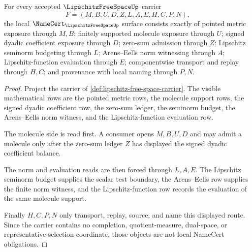 \begin{theorem}
\label{thm:lipschitz-free-space-namecert-obligations}
For every accepted $\LipschitzFreeSpaceUp$ carrier
$$
F=(M,B,U,D,Z,L,A,E,H,C,P,N),
$$
the local $\NameCert_{\LipschitzFreeSpaceUp}$ surface consists exactly of pointed metric exposure through $M,B$; finitely supported molecule exposure through $U$; signed dyadic coefficient exposure through $D$; zero-sum admission through $Z$; Lipschitz seminorm budgeting through $L$; Arens--Eells norm witnessing through $A$; Lipschitz-function evaluation through $E$; componentwise transport and replay through $H,C$; and provenance with local naming through $P,N$.
\end{theorem}
\begin{proof}
Project the carrier of \autoref{def:lipschitz-free-space-carrier}. The visible mathematical rows are the pointed metric rows, the molecule support rows, the signed dyadic coefficient row, the zero-sum ledger, the seminorm budget, the Arens--Eells norm witness, and the Lipschitz-function evaluation row.

The molecule side is read first. A consumer opens $M,B,U,D$ and may admit a molecule only after the zero-sum ledger $Z$ has displayed the signed dyadic coefficient balance.

The norm and evaluation reads are then forced through $L,A,E$. The Lipschitz seminorm budget supplies the scalar test boundary, the Arens--Eells row supplies the finite norm witness, and the Lipschitz-function row records the evaluation of the same molecule support.

Finally $H,C,P,N$ only transport, replay, source, and name this displayed route. Since the carrier contains no completion, quotient-measure, dual-space, or representative-selection coordinate, those objects are not local NameCert obligations.
\end{proof}


